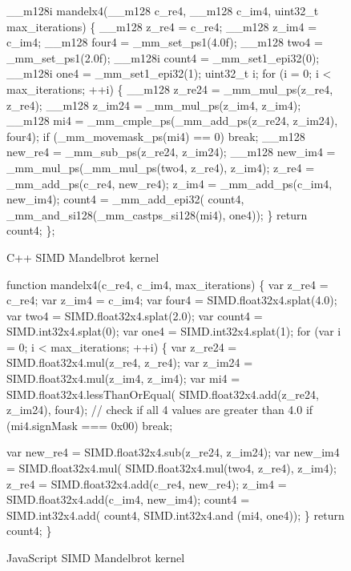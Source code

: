 \documentclass[preprint]{sigplanconf}
\begin{document}
\begin{figure}
\begin{small}
\begin{program}[style=tt, number=true]
\_\_\tab{}m128i mandelx4(\tab{}\_\_m128 c\_re4, \_\_m128 c\_im4,
                uint32\_t max\_iterations) \{\untab{}
  \_\_m128  z\_re4  = c\_re4;
  \_\_m128  z\_im4  = c\_im4;
  \_\_m128  four4  = \_mm\_set\_ps1(4.0f);
  \_\_m128  two4   = \_mm\_set\_ps1(2.0f);
  \_\_m128i count4 = \_mm\_set1\_epi32(0);
  \_\_m128i one4   = \_mm\_set1\_epi32(1);
  uint32\_t i;
  fo\tab{}r (i = 0; i < max\_iterations; ++i) \{
    \_\_m128 z\_re24 = \_mm\_mul\_ps(z\_re4, z\_re4);
    \_\_m128 z\_im24 = \_mm\_mul\_ps(z\_im4, z\_im4);
    \_\_\tab{}m128 mi4      =
      \_mm\_cmple\_ps(\_mm\_add\_ps(z\_re24, z\_im24), four4);\untab{}
    if\tab{} (\_mm\_movemask\_ps(mi4) == 0)
      break;\untab{}
    \_\_m128 new\_re4 = \_mm\_sub\_ps(z\_re24, z\_im24);
    \_\_m128 new\_im4 = \_mm\_mul\_ps(\_mm\_mul\_ps(two4, z\_re4), z\_im4);
    z\_re4 = \_mm\_add\_ps(c\_re4, new\_re4);
    z\_im4 = \_mm\_add\_ps(c\_im4, new\_im4);
    co\tab{}unt4 = \_mm\_add\_epi32(
      count4, \_mm\_and\_si128(\_mm\_castps\_si128(mi4), one4));\untab{}\untab{}
  \}
  return count4;\untab{}
\};
\end{program}
\end{small}
\caption{C++ SIMD Mandelbrot kernel}
\label{fig:mandel-cpp}
\end{figure}

\begin{figure}
\begin{small}
\begin{program}[style=tt, number=true]
fu\tab{}nction mandelx4(c\_re4, c\_im4, max\_iterations) \{
  var z\_re4  = c\_re4;
  var z\_im4  = c\_im4;
  var four4  = SIMD.float32x4.splat(4.0);
  var two4   = SIMD.float32x4.splat(2.0);
  var count4 = SIMD.int32x4.splat(0);
  var one4   = SIMD.int32x4.splat(1);
  fo\tab{}r (var i = 0; i < max\_iterations; ++i) \{
    var z\_re24 = SIMD.float32x4.mul(z\_re4, z\_re4);
    var z\_im24 = SIMD.float32x4.mul(z\_im4, z\_im4);
    var mi4    = SI\tab{}MD.float32x4.lessThanOrEqual(
                   SIMD.float32x4.add(z\_re24, z\_im24), four4);\untab{}
    // check if all 4 values are greater than 4.0
    if\tab{} (mi4.signMask === 0x00)
      break;\untab{}

    var new\_re4 = SIMD.float32x4.sub(z\_re24, z\_im24);
    va\tab{}r new\_im4 = SIMD.float32x4.mul(
      SIMD.float32x4.mul(two4, z\_re4), z\_im4);\untab{}
    z\_re4       = SIMD.float32x4.add(c\_re4, new\_re4);
    z\_im4       = SIMD.float32x4.add(c\_im4, new\_im4);
    co\tab{}unt4      = SIMD.int32x4.add(
      count4, SIMD.int32x4.and (mi4, one4));\untab{}\untab{}
  \}
  return count4;\untab{}
\}
\end{program}
\end{small}
\caption{JavaScript SIMD Mandelbrot kernel}
\label{fig:mandel-js}
\end{figure}
\end{document}
